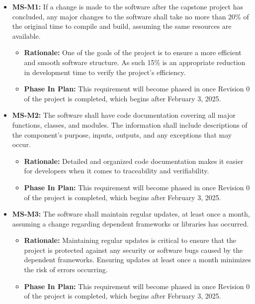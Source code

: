 \documentclass[12pt]{article}
\begin{document}
\begin{itemize}
  \item \label{MS-M1} \textbf{MS-M1:} If a change is made to the software after the capstone project has concluded, any major changes to the software shall take no more than 20\% of the original time to compile and build, assuming the same resources are available. 
    \begin{itemize}
      \item \textbf{Rationale:} One of the goals of the project is to ensure a more efficient and smooth software structure. As such 15\% is an appropriate reduction in development time to verify the project’s efficiency. 
      \item \textbf{Phase In Plan:} This requirement will become phased in once Revision 0 of the project is completed, which begins after February 3, 2025. 
    \end{itemize}
  \item \label{MS-M2} \textbf{MS-M2:} The software shall have code documentation covering all major functions, classes, and modules. The information shall include descriptions of the component’s purpose, inputs, outputs, and any exceptions that may occur.
  \begin{itemize}
    \item \textbf{Rationale:} Detailed and organized code documentation makes it easier for developers when it comes to traceability and verifiability. 
    \item \textbf{Phase In Plan:} This requirement will become phased in once Revision 0 of the project is completed, which begins after February 3, 2025. 
  \end{itemize}
  \item \label{MS-M3} \textbf{MS-M3:} The software shall maintain regular updates, at least once a month, assuming a change regarding dependent frameworks or libraries has occurred. 
  \begin{itemize}
    \item \textbf{Rationale:} Maintaining regular updates is critical to ensure that the project is protected against any security or software bugs caused by the dependent frameworks. Ensuring updates at least once a month minimizes the risk of errors occurring. 
    \item \textbf{Phase In Plan:} This requirement will become phased in once Revision 0 of the project is completed, which begins after February 3, 2025. 
  \end{itemize}
\end{itemize}
\end{document}
